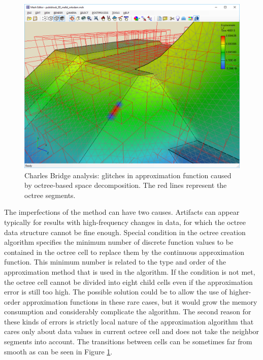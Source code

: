 \begin{figure}[H]
  \centering
  \includegraphics[width=\textwidth]{figures/chapter-approximation/charles-bridge-glitches-in-approximation}
  \decoRule
  \caption[Glitches in approximation function.]{Charles Bridge analysis: glitches in approximation function caused by octree-based space decomposition. The red lines represent the octree segments.}
  \label{fig:charles-bridge-glitches-in-approximation}
\end{figure}

The imperfections of the method can have two causes. Artifacts can appear typically for results with high-frequency changes in data, for which the octree data structure cannot be fine enough. Special condition in the octree creation algorithm specifies the minimum number of discrete function values to be contained in the octree cell to replace them by the continuous approximation function. This minimum number is related to the type and order of the approximation method that is used in the algorithm. If the condition is not met, the octree cell cannot be divided into eight child cells even if the approximation error is still too high. The possible solution could be to allow the use of higher-order approximation functions in these rare cases, but it would grow the memory consumption and considerably complicate the algorithm. The second reason for these kinds of errors is strictly local nature of the approximation algorithm that cares only about data values in current octree cell and does not take the neighbor segments into account. The transitions between cells can be sometimes far from smooth as can be seen in Figure \ref{fig:charles-bridge-glitches-in-approximation}.

